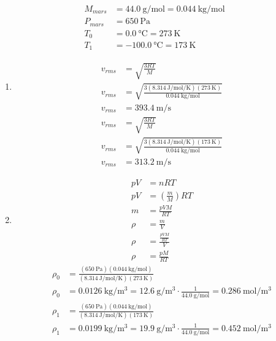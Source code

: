 \documentclass{article}
\begin{document}
\begin{align*}
	M_{mars} & = \SI{44.0}{\gram \per \mole} = \SI{0.044}{\kilogram \per \mole} \\
	P_{mars} & = \SI{650}{\pascal} \\
	T_0 & = \SI{0.0}{\celsius} = \SI{273}{\kelvin} \\
	T_1 & = \SI{-100.0}{\celsius} = \SI{173}{\kelvin}
\end{align*}
\begin{enumerate}[label = \textbf{(\alph*)}]
	\item
		\begin{align*}
			v_{rms} & = \sqrt{ \frac{ 3RT }{ M } } \\
			v_{rms} & = \sqrt{ \frac{ 3(\SI{8.314}{\joule \per \mole \per \kelvin})(\SI{273}{\kelvin}) }{ \SI{0.044}{\kilogram \per \mole} } } \\
			v_{rms} & = \SI{393.4}{\meter \per \second}
		\end{align*}
		\begin{align*}
			v_{rms} & = \sqrt{ \frac{ 3RT }{ M } } \\
			v_{rms} & = \sqrt{ \frac{ 3(\SI{8.314}{\joule \per \mole \per \kelvin})(\SI{173}{\kelvin}) }{ \SI{0.044}{\kilogram \per \mole} } } \\
			v_{rms} & = \SI{313.2}{\meter \per \second}
		\end{align*}
	\item
		\begin{align*}
			pV & = nRT \\
			pV & = \left( \frac{ m }{ M } \right) RT \\
			m & = \frac{ pVM }{ RT } \\
			\rho & = \frac{ m }{ V } \\
			\rho & = \frac{ \frac{ pVM }{ RT } }{ V } \\
			\rho & = \frac{ pM }{ RT }
		\end{align*}
		\begin{align*}
			\rho_0 & = \frac{ (\SI{650}{\pascal})(\SI{0.044}{\kilogram \per \mole}) }{ (\SI{8.314}{\joule \per \mole \per \kelvin})(\SI{273}{\kelvin}) } \\
			\rho_0 & = \SI{0.0126}{\kilogram \per \meter \cubed} = \SI{12.6}{\gram \per \meter \cubed} \cdot \frac{ 1 }{ \SI{44.0}{\gram \per \mole} } = \SI{0.286}{\mole \per \meter \cubed}
		\end{align*}
		\begin{align*}
			\rho_1 & = \frac{ (\SI{650}{\pascal})(\SI{0.044}{\kilogram \per \mole}) }{ (\SI{8.314}{\joule \per \mole \per \kelvin})(\SI{173}{\kelvin}) } \\
			\rho_1 & = \SI{0.0199}{\kilogram \per \meter \cubed} = \SI{19.9}{\gram \per \meter \cubed} \cdot \frac{ 1 }{ \SI{44.0}{\gram \per \mole} } = \SI{0.452}{\mole \per \meter \cubed}
		\end{align*}
\end{enumerate}
\end{document}
